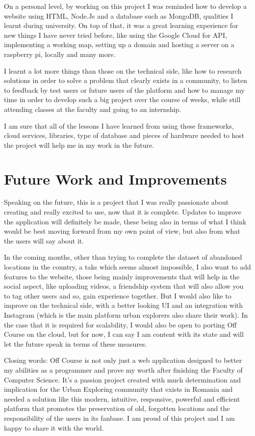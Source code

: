 \documentclass[12pt,a4paper]{report}
\begin{document}
On a personal level, by working on this project I was reminded how to develop a website using HTML, Node.Js and a database such as MongoDB, qualities I learnt during university. On top of that, it was a great learning experience for new things I have never tried before, like using the Google Cloud for API, implementing a working map, setting up a domain and hosting a server on a raspberry pi, locally and many more.

I learnt a lot more things than those on the technical side, like how to research solutions in order to solve a problem that clearly exists in a community, to listen to feedback by test users or future users of the platform and how to manage my time in order to develop such a big project over the course of weeks, while still attending classes at the faculty and going to an internship.

I am sure that all of the lessons I have learned from using these frameworks, cloud services, libraries, type of database and pieces of hardware needed to host the project will help me in my work in the future.

\section*{Future Work and Improvements}

Speaking on the future, this is a project that I was really passionate about creating and really excited to use, now that it is complete. Updates to improve the application will definitely be made, these being also in terms of what I think would be best moving forward from my own point of view, but also from what the users will say about it.

In the coming months, other than trying to complete the dataset of abandoned locations in the country, a taks which seems almost impossible, I also want to add features to the website, those being mainly improvements that will help in the social aspect, like uploading videos, a friendship system that will also allow you to tag other users and so, gain experience together. But I would also like to improve on the technical side, with a better looking UI and an integration with Instagram (which is the main platform urban explorers also share their work). In the case that it is required for scalability, I would also be open to porting Off Course on the cloud, but for now, I can say I am content with its state and will let the future speak in terms of these measures.

Closing words: Off Course is not only just a web application designed to better my abilities as a programmer and prove my worth after finishing the Faculty of Computer Science. It's a passion project created with much determination and implication for the Urban Exploring community that exists in Romania and needed a solution like this modern, intuitive, responsive, powerful and efficient platform that promotes the preservation of old, forgotten locations and the responsibility of the users in its fanbase. I am proud of this project and I am happy to share it with the world.



\end{document}
